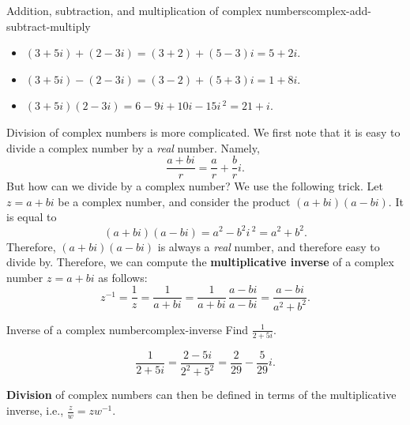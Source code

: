 \begin{example}{Addition, subtraction, and multiplication of complex numbers}{complex-add-subtract-multiply}
  \begin{itemize}
  \item $(3+5i) + (2-3i) = (3+2) + (5-3)i         = 5 + 2i$.
  \item $(3+5i) - (2-3i) = (3-2) + (5+3)i         = 1 + 8i$.
  \item $(3+5i) (2-3i)   = 6 - 9i + 10i - 15i\,^2 = 21 + i$.
  \end{itemize}
\end{example}

Division of complex numbers is more complicated. We first note that it
is easy to divide a complex number by a {\em real} number. Namely,
\begin{equation*}
  \frac{a+bi}{r} = \frac{a}{r} + \frac{b}{r}i.
\end{equation*}
But how can we divide by a complex number? We use the following
trick. Let $z=a+bi$ be a complex number, and consider the product
$(a+bi)(a-bi)$. It is equal to
\begin{equation*}
  (a+bi)(a-bi) = a^2 - b^2i\,^2 = a^2+b^2.
\end{equation*}
Therefore, $(a+bi)(a-bi)$ is always a {\em real} number, and therefore
easy to divide by. Therefore, we can compute the
\textbf{multiplicative inverse}%
%
%
 of a complex number $z=a+bi$ as
follows:
\begin{equation*}
  z^{-1}
  = \frac{1}{z}
  = \frac{1}{a+bi}
  = \frac{1}{a+bi}\,\frac{a-bi}{a-bi}=\frac{a-bi}{a^{2}+b^{2}}.
\end{equation*}

\begin{example}{Inverse of a complex number}{complex-inverse}
  Find $\displaystyle\frac{1}{2+5i}$.
\end{example}

\begin{solution}
  \begin{equation*}
    \frac{1}{2+5i}
    = \frac{2-5i}{2^2+5^2}
    = \frac{2}{29} - \frac{5}{29}i.
  \end{equation*}
\end{solution}

\textbf{Division}%
 of complex numbers can then be
defined in terms of the multiplicative inverse, i.e.,
$\frac{z}{w} = zw^{-1}$.

